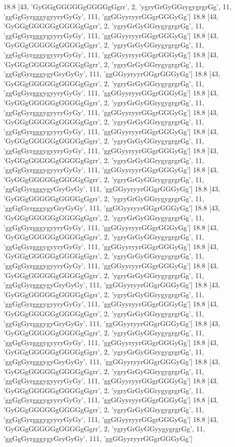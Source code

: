 18.8 [43, 'GyGGgGGGGGgGGGGgGgrr', 2, 'ygryGrGyGGrygygrgrGg', 11, 'ggGgGyrgggygyyryGyGy', 111, 'ggGGyyryyrGGgrGGGyGg']
18.8 [43, 'GyGGgGGGGGgGGGGgGgrr', 2, 'ygryGrGyGGrygygrgrGg', 11, 'ggGgGyrgggygyyryGyGy', 111, 'ggGGyyryyrGGgrGGGyGg']
18.8 [43, 'GyGGgGGGGGgGGGGgGgrr', 2, 'ygryGrGyGGrygygrgrGg', 11, 'ggGgGyrgggygyyryGyGy', 111, 'ggGGyyryyrGGgrGGGyGg']
18.8 [43, 'GyGGgGGGGGgGGGGgGgrr', 2, 'ygryGrGyGGrygygrgrGg', 11, 'ggGgGyrgggygyGryGyGy', 111, 'ggGGyyryyrGGgrGGGyGg']
18.8 [43, 'GyGGgGGGGGgGGGGgGgrr', 2, 'ygryGrGyGGrygygrgrGg', 11, 'ggGgGyrgggygyyryGyGy', 111, 'ggGGyyryyrGGgrGGGyGg']
18.8 [43, 'GyGGgGGGGGgGGGGgGgrr', 2, 'ygryGrGyGGrygygrgrGg', 11, 'ggGgGyrgggygyyryGyGy', 111, 'ggGGyyryyrGGgrGGGyGg']
18.8 [43, 'GyGGgGGGGGgGGGGgGgrr', 2, 'ygryGrGyGGrygygrgrGg', 11, 'ggGgGyrgggygyyryGyGy', 111, 'ggGGyyryyrGGgrGGGyGg']
18.8 [43, 'GyGGgGGGGGgGGGGgGgrr', 2, 'ygryGrGyGGrygygrgrGg', 11, 'ggGgGyrgggygyyryGyGy', 111, 'ggGGyyryyrGGgrGGGyGg']
18.8 [43, 'GyGGgGGGGGgGGGGgGgrr', 2, 'ygryGrGyGGrygygrgrGg', 11, 'ggGgGyrgggygyyryGyGy', 111, 'ggGGyyryyrGGgrGGGyGg']
18.8 [43, 'GyGGgGGGGGgGGGGgGgrr', 2, 'ygryGrGyGGrygygrgrGg', 11, 'ggGgGyrgggygyGryGyGy', 111, 'ggGGyyryyrGGgrGGGyGg']
18.8 [43, 'GyGGgGGGGGgGGGGgGgrr', 2, 'ygryGrGyGGrygygrgrGg', 11, 'ggGgGyrgggygyGryGyGy', 111, 'ggGGyyryyrGGgrGGGyGg']
18.8 [43, 'GyGGgGGGGGgGGGGgGgrr', 2, 'ygryGrGyGGrygygrgrGg', 11, 'ggGgGyrgggygyyryGyGy', 111, 'ggGGyyryyrGGgrGGGyGg']
18.8 [43, 'GyGGgGGGGGgGGGGgGgrr', 2, 'ygryGrGyGGrygygrgrGg', 11, 'ggGgGyrgggygyyryGyGy', 111, 'ggGGyyryyrGGgrGGGyGg']
18.8 [43, 'GyGGgGGGGGgGGGGgGgrr', 2, 'ygryGrGyGGrygygrgrGg', 11, 'ggGgGyrgggygyyryGyGy', 111, 'ggGGyyryyrGGgrGGGyGg']
18.8 [43, 'GyGGgGGGGGgGGGGgGgrr', 2, 'ygryGrGyGGrygygrgrGg', 11, 'ggGgGyrgggygyGryGyGy', 111, 'ggGGyyryyrGGgrGGGyGg']
18.8 [43, 'GyGGgGGGGGgGGGGgGgrr', 2, 'ygryGrGyGGrygygrgrGg', 11, 'ggGgGyrgggygyyryGyGy', 111, 'ggGGyyryyrGGgrGGGyGg']
18.8 [43, 'GyGGgGGGGGgGGGGgGgrr', 2, 'ygryGrGyGGrygygrgrGg', 11, 'ggGgGyrgggygyGryGyGy', 111, 'ggGGyyryyrGGgrGGGyGg']
18.8 [43, 'GyGGgGGGGGgGGGGgGgrr', 2, 'ygryGrGyGGrygygrgrGg', 11, 'ggGgGyrgggygyyryGyGy', 111, 'ggGGyyryyrGGgrGGGyGg']
18.8 [43, 'GyGGgGGGGGgGGGGgGgrr', 2, 'ygryGrGyGGrygygrgrGg', 11, 'ggGgGyrgggygyGryGyGy', 111, 'ggGGyyryyrGGgrGGGyGg']
18.8 [43, 'GyGGgGGGGGgGGGGgGgrr', 2, 'ygryGrGyGGrygygrgrGg', 11, 'ggGgGyrgggygyyryGyGy', 111, 'ggGGyyryyrGGgrGGGyGg']
18.8 [43, 'GyGGgGGGGGgGGGGgGgrr', 2, 'ygryGrGyGGrygygrgrGg', 11, 'ggGgGyrgggygyyryGyGy', 111, 'ggGGyyryyrGGgrGGGyGg']
18.8 [43, 'GyGGgGGGGGgGGGGgGgrr', 2, 'ygryGrGyGGrygygrgrGg', 11, 'ggGgGyrgggygyyryGyGy', 111, 'ggGGyyryyrGGgrGGGyGg']
18.8 [43, 'GyGGgGGGGGgGGGGgGgrr', 2, 'ygryGrGyGGyygygrgrGg', 11, 'ggGgGyrgggygyGryGyGy', 111, 'ggGGyyryyrGGgrGGGyGg']

